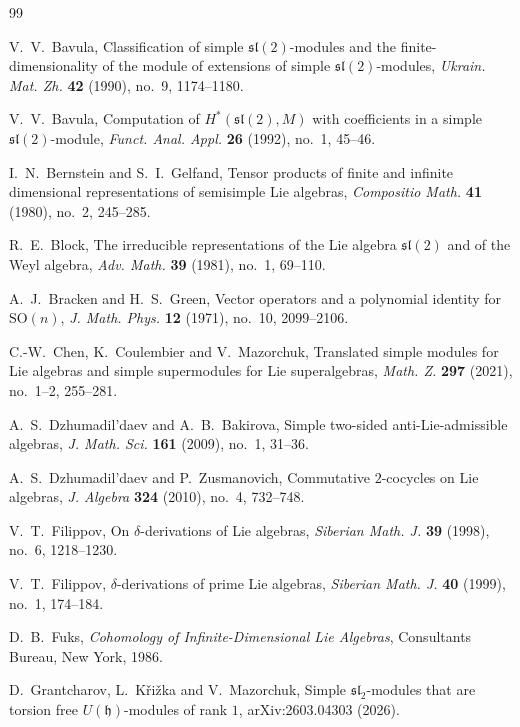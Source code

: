 \documentclass[11pt,reqno]{amsart}
\numberwithin{equation}{section}
\theoremstyle{definition}
\theoremstyle{remark}
\begin{document}
\begin{thebibliography}{99}

V.~V.~Bavula,
Classification of simple \(\mathfrak{sl}(2)\)-modules and
the finite-dimensionality of the module of extensions of simple
\(\mathfrak{sl}(2)\)-modules,
\emph{Ukrain. Mat. Zh.} \textbf{42} (1990), no.~9, 1174--1180.

V.~V.~Bavula,
Computation of \(H^*(\mathfrak{sl}(2),M)\) with coefficients in a
simple \(\mathfrak{sl}(2)\)-module,
\emph{Funct. Anal. Appl.} \textbf{26} (1992), no.~1, 45--46.

I.~N.~Bernstein and S.~I.~Gelfand,
Tensor products of finite and infinite dimensional representations
of semisimple Lie algebras,
\emph{Compositio Math.} \textbf{41} (1980), no.~2, 245--285.

R.~E.~Block,
The irreducible representations of the Lie algebra
\(\mathfrak{sl}(2)\) and of the Weyl algebra,
\emph{Adv. Math.} \textbf{39} (1981), no.~1, 69--110.

A.~J.~Bracken and H.~S.~Green,
Vector operators and a polynomial identity for \(\mathrm{SO}(n)\),
\emph{J. Math. Phys.} \textbf{12} (1971), no.~10, 2099--2106.

C.-W.~Chen, K.~Coulembier and V.~Mazorchuk,
Translated simple modules for Lie algebras and simple supermodules
for Lie superalgebras,
\emph{Math. Z.} \textbf{297} (2021), no.~1--2, 255--281.

A.~S.~Dzhumadil'daev and A.~B.~Bakirova,
Simple two-sided anti-Lie-admissible algebras,
\emph{J. Math. Sci.} \textbf{161} (2009), no.~1, 31--36.

A.~S.~Dzhumadil'daev and P.~Zusmanovich,
Commutative \(2\)-cocycles on Lie algebras,
\emph{J. Algebra} \textbf{324} (2010), no.~4, 732--748.

V.~T.~Filippov,
On \(\delta\)-derivations of Lie algebras,
\emph{Siberian Math. J.} \textbf{39} (1998), no.~6, 1218--1230.

V.~T.~Filippov,
\(\delta\)-derivations of prime Lie algebras,
\emph{Siberian Math. J.} \textbf{40} (1999), no.~1, 174--184.

D.~B.~Fuks,
\emph{Cohomology of Infinite-Dimensional Lie Algebras},
Consultants Bureau, New York, 1986.

D.~Grantcharov, L.~K\v{r}i\v{z}ka and V.~Mazorchuk,
Simple \(\mathfrak{sl}_2\)-modules that are torsion free
\(U(\mathfrak h)\)-modules of rank \(1\),
arXiv:2603.04303 (2026).


\end{thebibliography}
\end{document}
